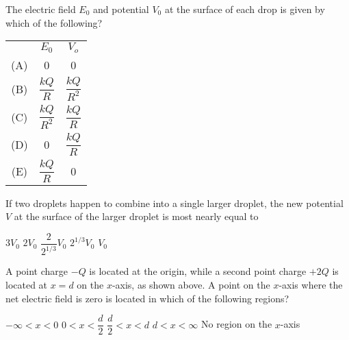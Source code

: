 \documentclass[12pt]{../../oss-classkick-exam}
\begin{document}
\begin{questions}

  \question The electric field $E_0$ and potential $V_0$ at the surface of each
  drop is given by which of the following?
  \label{rain1}
  
  \begin{tabular}{ccc}
    & \underline{$E_0$} & \underline{$V_o$} \\
    (A) & 0 & 0 \\
    (B) & $\dfrac{kQ}R$ & $\dfrac{kQ}{R^2}$ \\
    (C) & $\dfrac{kQ}{R^2}$ & $\dfrac{kQ}R$ \\
    (D) & 0 & $\dfrac{kQ}R$ \\
    (E) & $\dfrac{kQ}R$ & 0
  \end{tabular}

  \question If two droplets happen to combine into a single larger droplet, the
  new potential $V$ at the surface of the larger droplet is most nearly equal to
  \label{rain2}
  
  \begin{oneparchoices}
    \choice $3V_0$\hspace{.2in}
    \choice $2V_0$\hspace{.2in}
    \choice $\dfrac2{2^{1/3}}V_0$\hspace{.2in}
    \choice $2^{1/3}V_0$\hspace{.2in}
    \choice $V_0$
  \end{oneparchoices}

  \uplevel{\rule{\linewidth}{.7pt}}
  
  \question A point charge $-Q$ is located at the origin, while a second point
  charge $+2Q$ is located at $x=d$ on the $x$-axis, as shown above. A point on
  the $x$-axis where the net electric field is zero is located in which of the
  following regions?

  \vspace{.1in}
  \begin{minipage}{.3\linewidth}
  \end{minipage}
  \begin{minipage}{.4\textwidth}
    \begin{choices}
      \choice $-\infty<x<0$
      \choice $0<x<\dfrac{d}2$
      \choice $\dfrac{d}2<x<d$
      \choice $d<x<\infty$
      \choice No region on the $x$-axis
    \end{choices}
  \end{minipage}
  

\end{questions}
\end{document}
